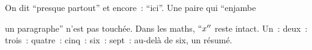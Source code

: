On dit ``presque partout'' et encore~: ``ici''.
Une paire qui ``enjambe

un paragraphe'' n'est pas touchée.
Dans les maths, $``x''$ reste intact.
Un~: deux~: trois~: quatre~: cinq~: six~: sept~: au-delà de six, un résumé.
